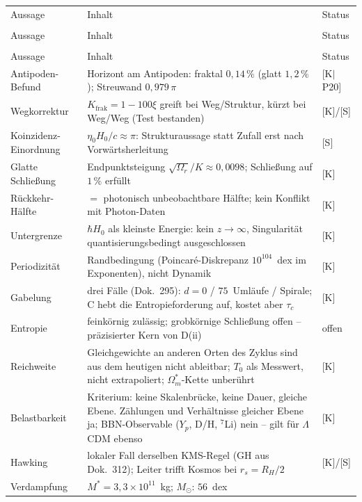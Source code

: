 {\small
\begin{longtable}{lp{6.4cm}l}
\toprule
Aussage & Inhalt & Status \\\\
\midrule
\endfirsthead
\toprule
Aussage & Inhalt & Status \\\\
\midrule
\endhead
\bottomrule
\endfoot

Aussage & Inhalt & Status \\
\midrule
Antipoden-Befund & Horizont am Antipoden: fraktal $0{,}14\,\%$
  (glatt $1{,}2\,\%$); Streuwand $0{,}979\,\pi$ & [K$|$P20] \\
Wegkorrektur & $K_\text{frak} = 1-100\xi$ greift bei Weg/Struktur,
  kürzt bei Weg/Weg (Test bestanden) & [K]/[S] \\
Koinzidenz-Einordnung & $\eta_0 H_0/c \approx \pi$: Strukturaussage
  statt Zufall erst nach Vorwärtsherleitung & [S] \\
Glatte Schließung & Endpunktsteigung $\sqrt{\Omega_r}/K
  \approx 0{,}0098$; Schließung auf $1\,\%$ erfüllt & [K] \\
Rückkehr-Hälfte & $=$ photonisch unbeobachtbare Hälfte;
  kein Konflikt mit Photon-Daten & [K] \\
Untergrenze & $\hbar H_0$ als kleinste Energie: kein $z\to\infty$,
  Singularität quantisierungsbedingt ausgeschlossen & [K] \\
Periodizität & Randbedingung (Poincaré-Diskrepanz
  $10^{104}$~dex im Exponenten), nicht Dynamik & [K] \\
Gabelung & drei Fälle (Dok.~295): $d=0$ / $75$~Umläufe / Spirale;
  C hebt die Entropieforderung auf, kostet aber $\tau_c$ & [K] \\
Entropie & feinkörnig zulässig; grobkörnige Schließung offen --
  präzisierter Kern von D(ii) & offen \\
Reichweite & Gleichgewichte an anderen Orten des Zyklus sind aus
  dem heutigen nicht ableitbar; $T_0$ als Messwert, nicht
  extrapoliert; $\Omega_m^{*}$-Kette unberührt & [K] \\
Belastbarkeit & Kriterium: keine Skalenbrücke, keine Dauer, gleiche
  Ebene. Zählungen und Verhältnisse gleicher Ebene ja;
  BBN-Observable ($Y_p$, D/H, ${}^7$Li) nein -- gilt für
  $\Lambda$CDM ebenso & [K] \\
Hawking & lokaler Fall derselben KMS-Regel (GH aus Dok.~312);
  Leiter trifft Kosmos bei $r_s = R_H/2$ & [K]/[S] \\
Verdampfung & $M^{*} = 3{,}3\times10^{11}$~kg; $M_\odot$: $56$~dex

\end{longtable}}
